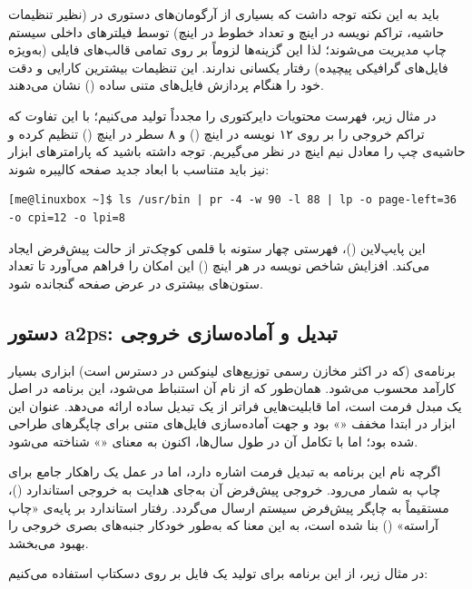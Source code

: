 باید به این نکته توجه داشت که بسیاری از آرگومان‌های دستوری در  (نظیر تنظیمات حاشیه، تراکم نویسه در اینچ و تعداد خطوط در اینچ) توسط فیلترهای داخلی سیستم چاپ مدیریت می‌شوند؛ لذا این گزینه‌ها لزوماً بر روی تمامی قالب‌های فایلی (به‌ویژه فایل‌های گرافیکی پیچیده) رفتار یکسانی ندارند. این تنظیمات بیشترین کارایی و دقت خود را هنگام پردازش فایل‌های متنی ساده () نشان می‌دهند.

در مثال زیر، فهرست محتویات دایرکتوری را مجدداً تولید می‌کنیم؛ با این تفاوت که تراکم خروجی را بر روی ۱۲ نویسه در اینچ () و ۸ سطر در اینچ () تنظیم کرده و حاشیه‌ی چپ را معادل نیم اینچ در نظر می‌گیریم. توجه داشته باشید که پارامترهای ابزار  نیز باید متناسب با ابعاد جدید صفحه کالیبره شوند:

\begin{latin}
\begin{lstlisting}
[me@linuxbox ~]$ ls /usr/bin | pr -4 -w 90 -l 88 | lp -o page-left=36 -o cpi=12 -o lpi=8
\end{lstlisting}
\end{latin}

این پایپ‌لاین ()، فهرستی چهار ستونه با قلمی کوچک‌تر از حالت پیش‌فرض ایجاد می‌کند. افزایش شاخص نویسه در هر اینچ () این امکان را فراهم می‌آورد تا تعداد ستون‌های بیشتری در عرض صفحه گنجانده شود.

\subsection{دستور a2ps: تبدیل و آماده‌سازی خروجی}

برنامه‌ی  (که در اکثر مخازن رسمی توزیع‌های لینوکس در دسترس است) ابزاری بسیار کارآمد محسوب می‌شود. همان‌طور که از نام آن استنباط می‌شود، این برنامه در اصل یک مبدل فرمت است، اما قابلیت‌هایی فراتر از یک تبدیل ساده ارائه می‌دهد. عنوان این ابزار در ابتدا مخفف «» بود و جهت آماده‌سازی فایل‌های متنی برای چاپگرهای  طراحی شده بود؛ اما با تکامل آن در طول سال‌ها، اکنون به معنای «» شناخته می‌شود.

اگرچه نام این برنامه به تبدیل فرمت اشاره دارد، اما در عمل یک راهکار جامع برای چاپ به شمار می‌رود. خروجی پیش‌فرض آن به‌جای هدایت به خروجی استاندارد ()، مستقیماً به چاپگر پیش‌فرض سیستم ارسال می‌گردد. رفتار استاندارد  بر پایه‌ی «چاپ آراسته» () بنا شده است، به این معنا که به‌طور خودکار جنبه‌های بصری خروجی را بهبود می‌بخشد.

در مثال زیر، از این برنامه برای تولید یک فایل  بر روی دسکتاپ استفاده می‌کنیم:

